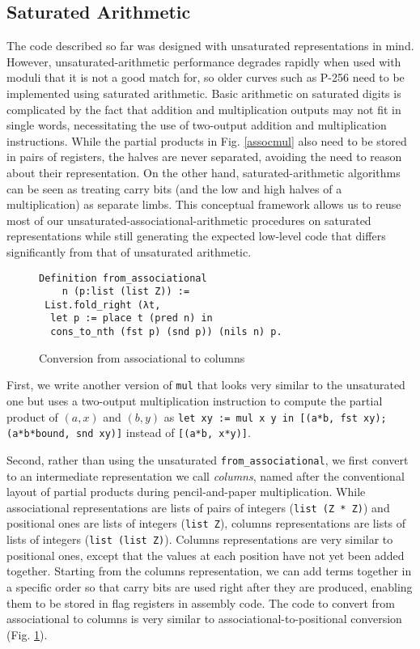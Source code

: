 \documentclass[conference,letterpaper]{IEEEtran}
\begin{document}
\subsection{Saturated Arithmetic}\label{saturated}

The code described so far was designed with unsaturated representations in mind.
However, unsaturated-arithmetic performance degrades rapidly when used with moduli that it is not a good match for, so older curves such as P-256 need to be implemented using saturated arithmetic.
Basic arithmetic on saturated digits is complicated by the fact that addition and multiplication outputs may not fit in single words, necessitating the use of two-output addition and multiplication instructions.
While the partial products in Fig. \ref{assocmul} also need to be stored in pairs of registers, the halves are never separated, avoiding the need to reason about their representation.
On the other hand, saturated-arithmetic algorithms can be seen as treating carry bits (and the low and high halves of a multiplication) as separate limbs.
This conceptual framework allows us to reuse most of our unsaturated-associational-arithmetic procedures on saturated representations while still generating the expected low-level code that differs significantly from that of unsaturated arithmetic.

\begin{figure}
\begin{verbatim}
Definition from_associational
    n (p:list (list Z)) :=
 List.fold_right (λt,
  let p := place t (pred n) in
  cons_to_nth (fst p) (snd p)) (nils n) p.
\end{verbatim}
  \caption{\label{columnsfromassoc}Conversion from associational to columns}
\end{figure}


First, we write another version of \texttt{mul} that looks very similar to the unsaturated one but uses a two-output multiplication instruction to compute the partial product of $(a,x)$ and $(b,y)$ as \texttt{let xy := mul x y in [(a*b, fst xy); (a*b*bound, snd xy)]} instead of \texttt{[(a*b, x*y)]}.

Second, rather than using the unsaturated \texttt{from\_associational}, we first convert to an intermediate representation we call \emph{columns}, named after the conventional layout of partial products during pencil-and-paper multiplication.
While associational representations are lists of pairs of integers (\texttt{list (Z * Z)}) and positional ones are lists of integers (\texttt{list Z}), columns representations are lists of lists of integers (\texttt{list (list Z)}).
Columns representations are very similar to positional ones, except that the values at each position have not yet been added together.
Starting from the columns representation, we can add terms together in a specific order so that carry bits are used right after they are produced, enabling them to be stored in flag registers in assembly code.
The code to convert from associational to columns is very similar to associational-to-positional conversion (Fig. \ref{columnsfromassoc}).
\end{document}
